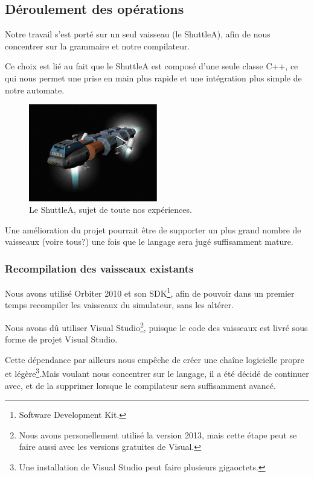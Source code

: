 \documentclass[a4paper,11pt]{article}
\begin{document}
    \subsection{Déroulement des opérations}
        Notre travail s'est porté sur un seul vaisseau (le ShuttleA), afin de nous concentrer sur la grammaire et notre compilateur. 
        
        Ce choix est lié au fait que le ShuttleA est composé d'une seule classe C++, ce qui nous permet une prise en main plus rapide et une intégration plus simple de notre automate. 
        
        \begin{figure}[!h]
            \begin{center}
                \includegraphics[width=0.5\textwidth]{img/shuttleA.png}
                \caption{Le ShuttleA, sujet de toute nos expériences.}
            \end{center}
        \end{figure}
        
        Une amélioration du projet pourrait être de supporter un plus grand nombre de vaisseaux (voire tous?) une fois que le langage sera jugé suffisamment mature.



    \subsubsection{Recompilation des vaisseaux existants}
        Nous avons utilisé Orbiter 2010 et son SDK\footnote{Software Development Kit.}, afin de pouvoir dans un premier temps recompiler les vaisseaux du simulateur, sans les altérer.

        Nous avons dû utiliser Visual Studio\footnote{Nous avons personellement utilisé la version 2013, mais cette étape peut se faire aussi avec les versions gratuites de Visual.}, puisque le code des vaisseaux est livré sous forme de projet Visual Studio. 
        
        Cette dépendance par ailleurs nous empêche de créer une chaîne logicielle propre et légère\footnote{Une installation de Visual Studio peut faire plusieurs gigaoctets.}.Mais voulant nous concentrer sur le langage, il a été décidé de continuer avec, et de la supprimer lorsque le compilateur sera suffisamment avancé.
\end{document}
